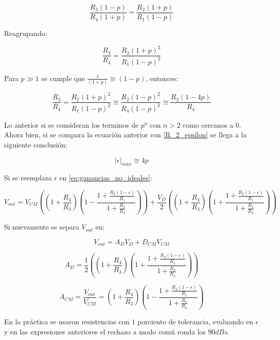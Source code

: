 \begin{equation}
\frac{R_3(1 - p)}{R_4(1 + p)} = \frac{R_2(1 + p)}{R_1(1 - p)}
\end{equation}

Reagrupando:

\begin{equation}
\frac{R_3}{R_4} = \frac{R_2(1 + p)^2}{R_1(1 - p)^2}
\end{equation}

Para $p \gg 1$ se cumple que  $\frac{1}{(1 + p)} \cong (1 - p)$, entonces:

\begin{equation}
\frac{R_3}{R_4} = \frac{R_2(1 + p)^2}{R_1(1 - p)^2} \cong	 \frac{R_2(1 - p)^2}{R_4(1 - p)^2} \cong \frac{R_2(1 - 4p)}{R_4}
\end{equation}

Lo anterior si se consideran los terminos de $p^n$ con $n > 2$ como cercanos a $0$. Ahora bien, si se compara la ecuación anterior con \ref{R_2_epsilon} se llega a la siguiente conclusión:

\begin{equation}
|\epsilon|_{max} \cong 4p
\end{equation}



Si se reemplaza $\epsilon$ en \ref{eq:ganancias_no_ideales}:

\begin{equation}
V_{out} = V_{CM}((1 + \frac{R_4}{R_3})(1 - \frac{1 + \frac{R_2(1 - \epsilon)}{R_1}}{1 + \frac{R_3}{R_4}})) + \frac{V_D}{2}((1 + \frac{R_4}{R_3})(1 + \frac{1 + \frac{R_2(1 - \epsilon)}{R_1}}{1 + \frac{R_3}{R_4}}))
\end{equation}

Si nuevamente se separa $V_{out}$ en:

\begin{equation}
V_{out} = A_DV_D + D_{CM}V_{CM}
\end{equation}

\begin{equation}
A_D = \frac{1}{2}((1 + \frac{R_4}{R_3})(1 + \frac{1 + \frac{R_2(1 - \epsilon)}{R_1}}{1 + \frac{R_3}{R_4}}))
\end{equation}

\begin{equation}
A_{CM} = \frac{V_{out}}{V_{CM}} = (1 + \frac{R_4}{R_3})(1 - \frac{1 + \frac{R_2(1 - \epsilon)}{R_1}}{1 + \frac{R_3}{R_4}})
\end{equation}

En la pr\'actica se usaron resistencias con $1$ porciento de tolerancia, evaluando en $\epsilon$ y en las expresiones anteriores el rechazo a modo com\'n ronda los $90dBs$.

